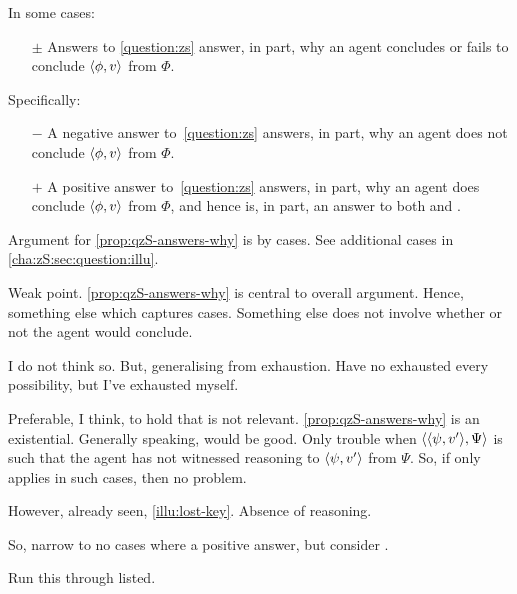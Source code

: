 \begin{note}
  \begin{idea}
    \label{prop:qzS-answers-why}
    In some cases:

    \begin{itemize}
    \item[\(\pm\)]
      Answers to \autoref{question:zs} answer, in part, why an agent concludes or fails to conclude \(\langle \phi, v \rangle\) from \(\Phi\).
    \end{itemize}

    Specifically:
    \begin{itemize}
    \item[\(-\)]
      A negative answer to~\autoref{question:zs} answers, in part, why an agent does not conclude \(\langle \phi, v \rangle\) from \(\Phi\).
    \item[\(+\)]
      A positive answer to~\autoref{question:zs} answers, in part, why an agent does conclude \(\langle \phi, v \rangle\) from \(\Phi\), and hence is, in part, an answer to both \qWhy{} and \qWhyV{}.
    \end{itemize}
  \end{idea}

  Argument for \autoref{prop:qzS-answers-why} is by cases.
  See additional cases in \autoref{cha:zS:sec:question:illu}.

  Weak point.
  \autoref{prop:qzS-answers-why} is central to overall argument.
  Hence, something else which captures cases.
  Something else does not involve whether or not the agent would conclude.

  I do not think so.
  But, generalising from exhaustion.
  Have no exhausted every possibility, but I've exhausted myself.

  Preferable, I think, to hold that \qzS{} is not relevant.
  \autoref{prop:qzS-answers-why} is an existential.
  Generally speaking, would be good.
  Only trouble when \(\langle \langle \psi, v' \rangle, \Psi \rangle\) is such that the agent has not witnessed reasoning to \(\langle \psi, v' \rangle\) from \(\Psi\).
  So, if \qzS{} only applies in such cases, then no problem.

  However, already seen, \autoref{illu:lost-key}.
  Absence of reasoning.

  So, narrow to no cases where a positive answer, but consider .
\end{note}

\begin{note}
  Run this through  listed.
\end{note}

